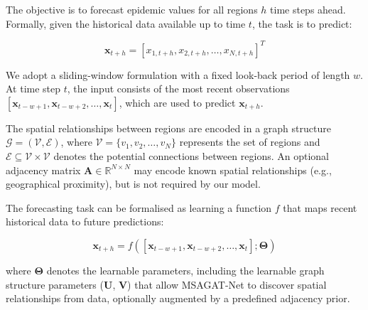 \documentclass[final,1p,times]{elsarticle}
\begin{document}
The objective is to forecast epidemic values for all regions $h$ time steps ahead. Formally, given the historical data available up to time $t$, the task is to predict:

\begin{equation}
\mathbf{x}_{t+h} = [x_{1,t+h}, x_{2,t+h}, \ldots, x_{N,t+h}]^T
\end{equation}

We adopt a sliding-window formulation with a fixed look-back period of length $w$. At time step $t$, the input consists of the most recent observations $[\mathbf{x}_{t-w+1}, \mathbf{x}_{t-w+2}, \ldots, \mathbf{x}_t]$, which are used to predict $\mathbf{x}_{t+h}$.

The spatial relationships between regions are encoded in a graph structure $\mathcal{G} = (\mathcal{V}, \mathcal{E})$, where $\mathcal{V} = \{v_1, v_2, \ldots, v_N\}$ represents the set of regions and $\mathcal{E} \subseteq \mathcal{V} \times \mathcal{V}$ denotes the potential connections between regions. An optional adjacency matrix $\mathbf{A} \in \mathbb{R}^{N \times N}$ may encode known spatial relationships (e.g., geographical proximity), but is not required by our model.

The forecasting task can be formalised as learning a function $f$ that maps recent historical data to future predictions:

\begin{equation}
\mathbf{x}_{t+h} = f([\mathbf{x}_{t-w+1}, \mathbf{x}_{t-w+2}, \ldots, \mathbf{x}_t]; \boldsymbol{\Theta})
\end{equation}

where $\boldsymbol{\Theta}$ denotes the learnable parameters, including the learnable graph structure parameters ($\mathbf{U}$, $\mathbf{V}$) that allow MSAGAT-Net to discover spatial relationships from data, optionally augmented by a predefined adjacency prior.
\end{document}

